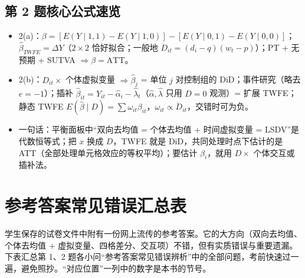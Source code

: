 \subsection{第 2 题核心公式速览}

\begin{summary}[第 2 题核心公式]
\begin{itemize}
  \item 2(a)：$\beta=[E(Y\mid1,1)-E(Y\mid1,0)]-[E(Y\mid0,1)-E(Y\mid0,0)]$；$\hat\beta_{TWFE}=\Delta Y$（$2\times2$ 恰好拟合；一般地 $\ddot D_{it}=(d_i-q)(w_t-p)$）；PT + 无预期 + SUTVA $\Rightarrow\beta=\text{ATT}$。
  \item 2(b)：$D_{it}\times$ 个体虚拟变量 $\Rightarrow\hat\beta_j$ = 单位 $j$ 对控制组的 DiD；事件研究（略去 $e=-1$）；插补 $\hat\beta_{it}=Y_{it}-\hat\alpha_i-\hat\lambda_t$（$\hat\alpha,\hat\lambda$ 只用 $D=0$ 观测）= 扩展 TWFE；静态 TWFE $E(\hat\beta\mid D)=\sum\omega_{it}\beta_{it}$，$\omega_{it}\propto\ddot D_{it}$，交错时可为负。
  \item 一句话：平衡面板中“双向去均值 = 个体去均值 + 时间虚拟变量 = LSDV”是代数恒等式；把 $x$ 换成 $D$，TWFE 就是 DiD，共同处理时点下估计的是 ATT（全部处理单元格效应的等权平均）；要估计 $\beta_i$，就用 $D\times$ 个体交互或插补法。
\end{itemize}
\end{summary}

\section{参考答案常见错误汇总表}\label{sec:U17b-errtab}

学生保存的试卷文件中附有一份网上流传的参考答案。它的大方向（双向去均值、个体去均值 + 虚拟变量、四格差分、交互项）不错，但有实质错误与重要遗漏。下表汇总第 1、2 题各小问“参考答案常见错误辨析”中的全部问题，考前快速过一遍，避免照抄。“对应位置”一列中的数字是本书的节号。

